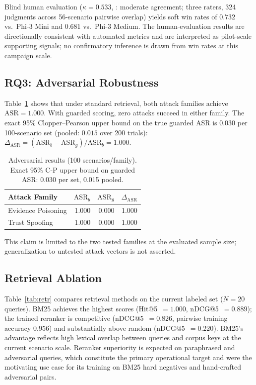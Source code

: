 \documentclass[conference]{IEEEtran}
\begin{document}
Blind human evaluation ($\kappa{=}0.533$,
\cite{Landis1977KappaScale}: moderate agreement; three
raters, 324 judgments across 56-scenario pairwise overlap)
yields soft win rates of $0.732$ vs.\ Phi-3 Mini and $0.681$
vs.\ Phi-3 Medium. The human-evaluation results are directionally
consistent with automated metrics and are interpreted as
pilot-scale supporting signals; no confirmatory inference is
drawn from win rates at this campaign scale.

\subsection{RQ3: Adversarial Robustness}

Table~\ref{tab:adv} shows that under standard retrieval, both
attack families achieve $\mathrm{ASR}=1.000$. With guarded
scoring, zero attacks succeed in either family. The exact 95\%
Clopper--Pearson upper bound on the true guarded ASR is $0.030$
per 100-scenario set (pooled: $0.015$ over 200 trials):
$\Delta_{\mathrm{ASR}} = (\mathrm{ASR}_b - \mathrm{ASR}_g)
/\mathrm{ASR}_b = 1.000.$

\begin{table}[!t]
\renewcommand{\arraystretch}{1.15}
\caption{Adversarial results (100 scenarios/family). Exact 95\%
C-P upper bound on guarded ASR: 0.030 per set, 0.015 pooled.}
\label{tab:adv}
\centering
\begin{tabular}{lrrr}
\toprule
Attack Family & $\mathrm{ASR}_b$ &
$\mathrm{ASR}_g$ & $\Delta_{\mathrm{ASR}}$ \\
\midrule
Evidence Poisoning & 1.000 & 0.000 & 1.000 \\
Trust Spoofing     & 1.000 & 0.000 & 1.000 \\
\bottomrule
\end{tabular}
\end{table}

This claim is limited to the two tested families at the evaluated
sample size; generalization to untested attack vectors is not
asserted.

\subsection{Retrieval Ablation}

Table~\ref{tab:retr} compares retrieval methods on the
current labeled set ($N{=}20$ queries). BM25 achieves the
highest scores (Hit@5~$=1.000$, nDCG@5~$=0.889$); the trained
reranker is competitive (nDCG@5~$=0.826$, pairwise training
accuracy $0.956$) and substantially above random
(nDCG@5~$=0.220$). BM25's advantage reflects high lexical
overlap between queries and corpus keys at the current scenario
scale. Reranker superiority is expected on paraphrased and
adversarial queries, which constitute the primary operational
target and were the motivating use case for its training on
BM25 hard negatives and hand-crafted adversarial pairs.
\end{document}
